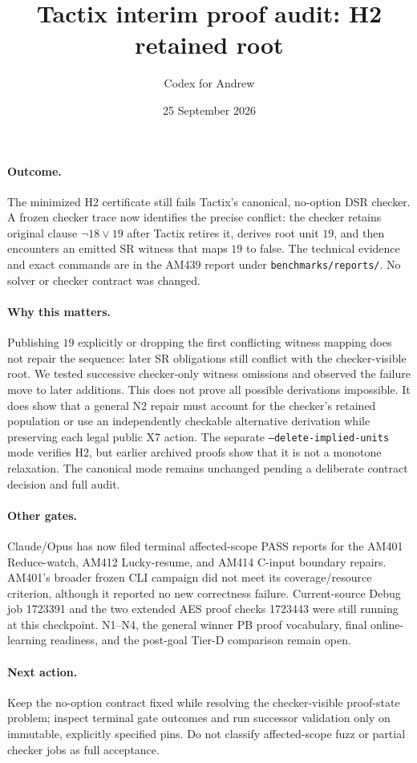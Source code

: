 \documentclass[11pt]{article}
\title{Tactix interim proof audit: H2 retained root}
\author{Codex for Andrew}
\date{25 September 2026}
\begin{document}
\maketitle

\paragraph{Outcome.} The minimized H2 certificate still fails Tactix's
canonical, no-option DSR checker. A frozen checker trace now identifies the
precise conflict: the checker retains original clause $\lnot18\lor19$ after
Tactix retires it, derives root unit $19$, and then encounters an emitted SR
witness that maps $19$ to false. The technical evidence and exact commands are
in the AM439 report under \texttt{benchmarks/reports/}. No solver or checker
contract was changed.

\paragraph{Why this matters.} Publishing $19$ explicitly or dropping the
first conflicting witness mapping does not repair the sequence: later SR
obligations still conflict with the checker-visible root. We tested successive
checker-only witness omissions and observed the failure move to later
additions. This does not prove all possible derivations impossible. It does
show that a general N2 repair must account for the checker's retained
population or use an independently checkable alternative derivation while
preserving each legal public X7 action. The separate
\texttt{--delete-implied-units} mode verifies H2, but earlier archived proofs
show that it is not a monotone relaxation. The canonical mode remains
unchanged pending a deliberate contract decision and full audit.

\paragraph{Other gates.} Claude/Opus has now filed terminal affected-scope
PASS reports for the AM401 Reduce-watch, AM412 Lucky-resume, and AM414 C-input
boundary repairs. AM401's broader frozen CLI campaign did not meet its
coverage/resource criterion, although it reported no new correctness
failure. Current-source Debug job 1723391 and the two extended AES proof
checks 1723443 were still running at this checkpoint. N1--N4, the general
winner PB proof vocabulary, final online-learning readiness, and the
post-goal Tier-D comparison remain open.

\paragraph{Next action.} Keep the no-option contract fixed while resolving
the checker-visible proof-state problem; inspect terminal gate outcomes and
run successor validation only on immutable, explicitly specified pins. Do
not classify affected-scope fuzz or partial checker jobs as full acceptance.
\end{document}
